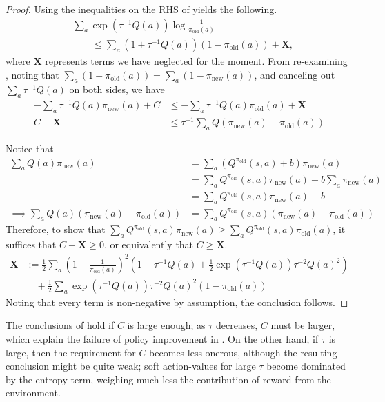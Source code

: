 \documentclass[twoside,11pt]{article}
\newcommand{\pinew}{{\pi_\mathrm{new}}}
\newcommand{\piold}{{\pi_\mathrm{old}}}
\begin{document}
\begin{proof}
Using the inequalities on the RHS of  yields the following. 
\begin{align*}
    &\sum_a \exp(\tau^{-1} Q(a)) \log\frac{1}{\piold(a)}\\
    &\hspace{2em} \leq \sum_a (1 + \tau^{-1} Q(a))(1 - \piold(a)) + \mathbf{X},
\end{align*}
where $\mathbf{X}$ represents terms we have neglected for the moment. From re-examining , noting that $\sum_a (1 - \piold(a)) = \sum_a (1 - \pinew(a))$, and canceling out $\sum_a \tau^{-1} Q(a)$ on both sides, we have
\begin{align*}
    -\sum_a \tau^{-1}Q(a) \pinew(a) + C &\leq -\sum_a \tau^{-1}Q(a) \piold(a) + \mathbf{X}\\
    C -\mathbf{X} &\leq \tau^{-1} \sum_a Q(\pinew(a) - \piold(a))
\end{align*}

Notice that 
\begin{align*}
\sum_a Q(a)\pinew(a) &= \sum_a (Q^{\piold}(s, a) + b )\pinew(a) \\
&=  \sum_a Q^{\piold}(s, a) \pinew(a) +  b \sum_a \pinew(a) \\
&= \sum_a Q^{\piold}(s, a) \pinew(a) +  b \\
\implies  \sum_a Q(a)(\pinew(a) - \piold(a)) &=  \sum_a Q^{\piold}(s,a)(\pinew(a) - \piold(a))
\end{align*}
%
Therefore, to show that $\sum_a Q^{\piold}(s,a)\pinew(a) \ge \sum_a Q^{\piold}(s,a)\piold(a)$, it suffices that $C -\mathbf{X} \geq 0$, or equivalently that $C \geq \mathbf{X}$. 
\begin{align*}
    \mathbf{X} &:=  \frac{1}{2}\sum_a  \left(1 - \frac{1}{\piold(a)}\right)^2 (1 + \tau^{-1} Q(a) + \frac{1}{2}\exp(\tau^{-1} Q(a)) \tau^{-2} Q(a)^2) \\
    &\quad + \frac{1}{2} \sum_a \exp(\tau^{-1} Q(a)) \tau^{-2} Q(a)^2 (1 - \piold(a))
\end{align*}
Noting that every term is non-negative by assumption, the conclusion follows.
\end{proof}
The conclusions of  hold if $C$ is large enough; as $\tau$ decreases, $C$ must be larger, which explain the failure of policy improvement in . On the other hand, if $\tau$ is large, then the requirement for $C$ becomes less onerous, although the resulting conclusion might be quite weak; soft action-values for large $\tau$ become dominated by the entropy term, weighing much less the contribution of reward from the environment. 
\end{document}
